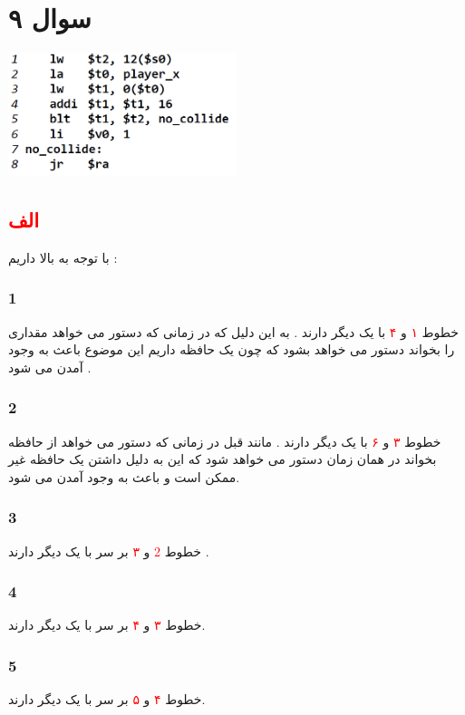 \documentclass{article}
\begin{document}
\section*{سوال ۹}
\begin{flushleft}
	\includegraphics[width=0.5\textwidth]{q9p1}
\end{flushleft}
\subsection*{\textcolor{red}{الف}}
با توجه به بالا داریم  : 
\subsubsection*{1}
 خطوط 
\textcolor{red}{۱}
و
\textcolor{red}{۴}
با یک دیگر 
\textcolor{blue}{}
دارند . به این دلیل که در زمانی که دستور 
می خواهد مقداری را بخواند دستور 
می خواهد 
بشود که چون یک حافظه داریم این موضوع باعث به وجود آمدن 
می شود  . 
\subsubsection*{2}
 خطوط 
\textcolor{red}{۳}
و 
\textcolor{red}{۶}
با یک دیگر 
\textcolor{blue}{}
دارند . مانند قبل در زمانی که دستور 
می خواهد از حافظه بخواند در همان زمان دستور 
می خواهد 
شود که این به دلیل داشتن یک حافظه غیر ممکن است و باعث به وجود آمدن 
می شود. 
\subsubsection*{3}
 خطوط
\textcolor{red}{2}
و 
\textcolor{red}{۳}
بر سر 
با یک دیگر 
\textcolor{blue}{}
دارند . 
\subsubsection*{4}
خطوط 
\textcolor{red}{۳}
و 
\textcolor{red}{۴}
بر سر 
با یک دیگر 
\textcolor{blue}{}
دارند. 
\subsubsection*{5}
خطوط 
\textcolor{red}{۴}
و
\textcolor{red}{۵}
بر سر 
با یک دیگر 
\textcolor{blue}{}
دارند. 
\end{document}
